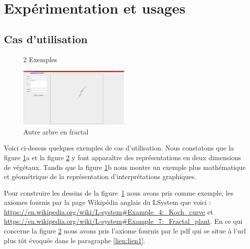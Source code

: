 \documentclass[12pt]{article}
\begin{document}
 
\section{Expérimentation et usages}
\subsection{Cas d'utilisation}
\begin{figure}[!ht]
\centering
{}
\hfill
{}
\caption{2 Exemples\label{fig:figure4}}
\end{figure}

\begin{figure}[h]
	\center
	\includegraphics[width=0.49\textwidth]{./images/AutreArbre.png}
	\caption{Autre arbre en fractal \label{fig:figure5}}
\end{figure}
\newpage
Voici ci-dessus quelques exemples de cas d'utilisation.
Nous constatons que la figure \ref{fig:figure4}a et la figure \ref{fig:figure5} y font apparaître des représentations en deux dimensions de végétaux. Tandis que la figure \ref{fig:figure4}b nous montre un exemple plus mathématique et géométrique de la représentation d'interprétations graphiques.

Pour construire les dessins de la figure~\ref{fig:figure4} nous avons pris comme exemple, les axiomes fournis par la page Wikipédia anglais du LSystem que voici : \url{https://en.wikipedia.org/wiki/L-system#Example_4:_Koch_curve} et \url{https://en.wikipedia.org/wiki/L-system#Example_7:_Fractal_plant}. En ce qui concerne la figure \ref{fig:figure5} nous avons pris l'axiome fournis par le pdf qui se situe à l'url plus tôt évoquée dans le paragraphe \ref{lien:lien1}.
\end{document}
